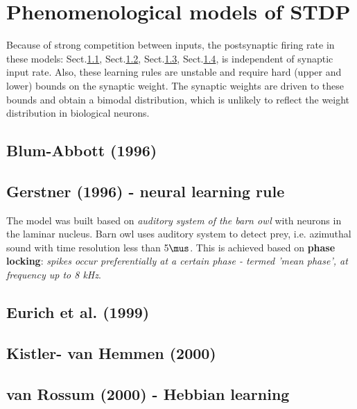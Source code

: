\chapter{Phenomenological models of STDP}
\label{chap:models-phenomenological_STDP}

Because of strong competition between inputs, the postsynaptic firing rate in
these models: Sect.\ref{sec:Blum-Abbott_1996},
Sect.\ref{sec:Gerstner-1996_neural-learning-rule}, Sect.\ref{sec:Eurich-1999},
Sect.\ref{sec:Kistler-vanHemmen_2000}, is independent of synaptic input rate.
Also, these learning rules are unstable and require hard (upper and lower)
bounds on the synaptic weight. The synaptic weights are driven to these bounds
and obtain a bimodal distribution, which is unlikely to reflect the weight
distribution in biological neurons.



\section{Blum-Abbott (1996)}
\label{sec:Blum-Abbott_1996}


\section{Gerstner (1996) - neural learning rule}
\label{sec:Gerstner-1996_neural-learning-rule}

The model was built based on {\it auditory system of the barn owl} with neurons
in the laminar nucleus. Barn owl uses auditory system to detect prey, i.e.
azimuthal sound with time resolution less than 5$\mus$.
This is achieved based on {\bf phase locking}: {\it spikes occur preferentially
at a certain phase - termed 'mean phase', at frequency up to 8 kHz}.

\section{Eurich et al. (1999)}
\label{sec:Eurich-1999}

\section{Kistler- van Hemmen (2000)}
\label{sec:Kistler-vanHemmen_2000}

\section{van Rossum (2000) - Hebbian learning}
\label{sec:vanRossum-2000}


